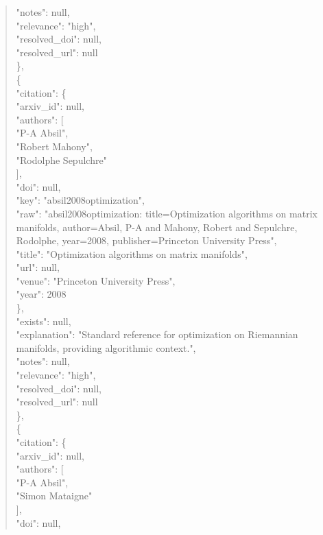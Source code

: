 \documentclass[11pt]{article}
\begin{document}
\begin{quote}
      "notes": null,\\
      "relevance": "high",\\
      "resolved\_doi": null,\\
      "resolved\_url": null\\
    \},\\
    \{\\
      "citation": \{\\
        "arxiv\_id": null,\\
        "authors": [\\
          "P-A Absil",\\
          "Robert Mahony",\\
          "Rodolphe Sepulchre"\\
        ],\\
        "doi": null,\\
        "key": "absil2008optimization",\\
        "raw": "absil2008optimization: title=Optimization algorithms on matrix manifolds, author=Absil, P-A and Mahony, Robert and Sepulchre, Rodolphe, year=2008, publisher=Princeton University Press",\\
        "title": "Optimization algorithms on matrix manifolds",\\
        "url": null,\\
        "venue": "Princeton University Press",\\
        "year": 2008\\
      \},\\
      "exists": null,\\
      "explanation": "Standard reference for optimization on Riemannian manifolds, providing algorithmic context.",\\
      "notes": null,\\
      "relevance": "high",\\
      "resolved\_doi": null,\\
      "resolved\_url": null\\
    \},\\
    \{\\
      "citation": \{\\
        "arxiv\_id": null,\\
        "authors": [\\
          "P-A Absil",\\
          "Simon Mataigne"\\
        ],\\
        "doi": null,\\

\end{quote}
\end{document}
